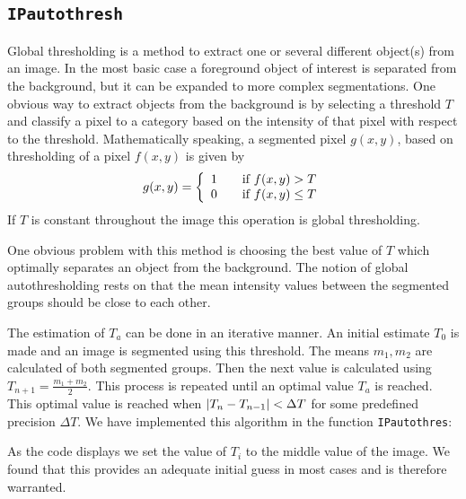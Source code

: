 \subsection{\texttt{IPautothresh}}
Global thresholding is a method to extract one or several different object(s) from an image. 
In the most basic case a foreground object of interest is separated from the background, but it can be expanded to more complex segmentations. 
One obvious way to extract objects from the background is by selecting a threshold \(T\) and classify a pixel to a category based on the intensity of that pixel with respect to the threshold.\cite[p. 738]{gonzalez2002digital} 
Mathematically speaking, a segmented pixel \(g(x, y)\), based on thresholding of a pixel \(f(x, y)\) is given by 
\[ 
  g(x,y) = \left\{ 
  \begin{array}{l l}
    1 & \quad \text{if \(f(x, y) > T\)}\\
    0 & \quad \text{if \(f(x, y) \leq T\)}
  \end{array} \right.
\]
If \(T\) is constant throughout the image this operation is global thresholding.

One obvious problem with this method is choosing the best value of \(T\) which optimally separates an object from the background. 
The notion of global autothresholding rests on that the mean intensity values between the segmented groups should be close to each other.

The estimation of \(T_a\) can be done in an iterative manner. 
An initial estimate \(T_0\) is made and an image is segmented using this threshold. 
The means \(m_1, m_2\) are calculated of both segmented groups.
Then the next value is calculated using \(T_{n+1} = \frac{m_1 + m_2}{2}\).
This process is repeated until an optimal value \(T_a\) is reached. 
This optimal value is reached when \(\lvert T_n - T_{n - 1}\rvert < \Delta T\) for some predefined precision \(\Delta T\).
\clearpage
We have implemented this algorithm in the function \texttt{IPautothres}:

As the code displays we set the value of \(T_i\) to the middle value of the image. 
We found that this provides an adequate initial guess in most cases and is therefore warranted. 

